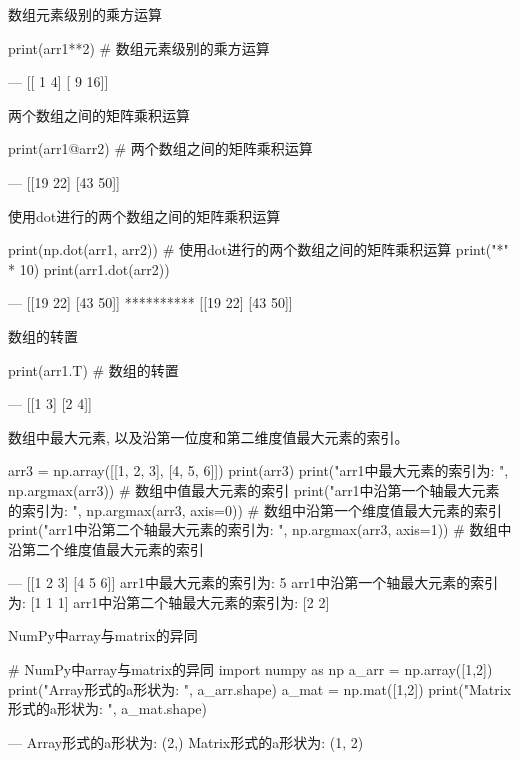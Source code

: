 数组元素级别的乘方运算 

\begin{python}
print(arr1**2)     # 数组元素级别的乘方运算 

---
[[ 1  4]
 [ 9 16]]
\end{python}

两个数组之间的矩阵乘积运算

\begin{python}
print(arr1@arr2)     # 两个数组之间的矩阵乘积运算

---
[[19 22]
 [43 50]]
\end{python}

使用dot进行的两个数组之间的矩阵乘积运算

\begin{python}
print(np.dot(arr1, arr2))   # 使用dot进行的两个数组之间的矩阵乘积运算
print("*" * 10)
print(arr1.dot(arr2))

---
[[19 22]
 [43 50]]
**********
[[19 22]
 [43 50]]
\end{python}

数组的转置

\begin{python}
print(arr1.T)      # 数组的转置

---
[[1 3]
 [2 4]]
\end{python}

数组中最大元素, 以及沿第一位度和第二维度值最大元素的索引。

\begin{python}
arr3 = np.array([[1, 2, 3], [4, 5, 6]])
print(arr3)
print("arr1中最大元素的索引为: ", np.argmax(arr3))                    # 数组中值最大元素的索引
print("arr1中沿第一个轴最大元素的索引为: ", np.argmax(arr3, axis=0))    # 数组中沿第一个维度值最大元素的索引
print("arr1中沿第二个轴最大元素的索引为: ", np.argmax(arr3, axis=1))    # 数组中沿第二个维度值最大元素的索引

---
[[1 2 3]
 [4 5 6]]
arr1中最大元素的索引为:  5
arr1中沿第一个轴最大元素的索引为:  [1 1 1]
arr1中沿第二个轴最大元素的索引为:  [2 2]
\end{python}

NumPy中array与matrix的异同

\begin{python}
# NumPy中array与matrix的异同
import numpy as np
a_arr = np.array([1,2])
print("Array形式的a形状为: ", a_arr.shape)
a_mat = np.mat([1,2])
print("Matrix形式的a形状为: ", a_mat.shape)

---
Array形式的a形状为:  (2,)
Matrix形式的a形状为:  (1, 2)
\end{python}

